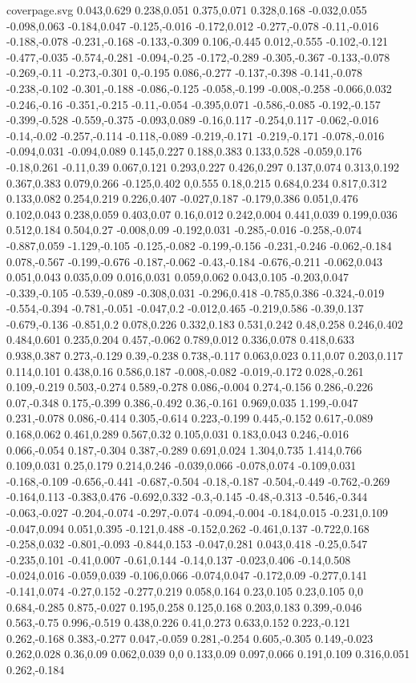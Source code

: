 \begin{filecontents}[noheader]{coverpage.svg}
0.043,0.629 0.238,0.051 0.375,0.071 0.328,0.168 -0.032,0.055 -0.098,0.063 -0.184,0.047 -0.125,-0.016 -0.172,0.012 -0.277,-0.078 -0.11,-0.016 -0.188,-0.078 -0.231,-0.168 -0.133,-0.309 0.106,-0.445 0.012,-0.555 -0.102,-0.121 -0.477,-0.035 -0.574,-0.281 -0.094,-0.25 -0.172,-0.289 -0.305,-0.367 -0.133,-0.078 -0.269,-0.11 -0.273,-0.301 0,-0.195 0.086,-0.277 -0.137,-0.398 -0.141,-0.078 -0.238,-0.102 -0.301,-0.188 -0.086,-0.125 -0.058,-0.199 -0.008,-0.258 -0.066,0.032 -0.246,-0.16 -0.351,-0.215 -0.11,-0.054 -0.395,0.071 -0.586,-0.085 -0.192,-0.157 -0.399,-0.528 -0.559,-0.375 -0.093,0.089 -0.16,0.117 -0.254,0.117 -0.062,-0.016 -0.14,-0.02 -0.257,-0.114 -0.118,-0.089 -0.219,-0.171 -0.219,-0.171 -0.078,-0.016 -0.094,0.031 -0.094,0.089 0.145,0.227 0.188,0.383 0.133,0.528 -0.059,0.176 -0.18,0.261 -0.11,0.39 0.067,0.121 0.293,0.227 0.426,0.297 0.137,0.074 0.313,0.192 0.367,0.383 0.079,0.266 -0.125,0.402 0,0.555 0.18,0.215 0.684,0.234 0.817,0.312 0.133,0.082 0.254,0.219 0.226,0.407 -0.027,0.187 -0.179,0.386 0.051,0.476 0.102,0.043 0.238,0.059 0.403,0.07 0.16,0.012 0.242,0.004 0.441,0.039 0.199,0.036 0.512,0.184 0.504,0.27 -0.008,0.09 -0.192,0.031 -0.285,-0.016 -0.258,-0.074 -0.887,0.059 -1.129,-0.105 -0.125,-0.082 -0.199,-0.156 -0.231,-0.246 -0.062,-0.184 0.078,-0.567 -0.199,-0.676 -0.187,-0.062 -0.43,-0.184 -0.676,-0.211 -0.062,0.043 0.051,0.043 0.035,0.09 0.016,0.031 0.059,0.062 0.043,0.105 -0.203,0.047 -0.339,-0.105 -0.539,-0.089 -0.308,0.031 -0.296,0.418 -0.785,0.386 -0.324,-0.019 -0.554,-0.394 -0.781,-0.051 -0.047,0.2 -0.012,0.465 -0.219,0.586 -0.39,0.137 -0.679,-0.136 -0.851,0.2 0.078,0.226 0.332,0.183 0.531,0.242 0.48,0.258 0.246,0.402 0.484,0.601 0.235,0.204 0.457,-0.062 0.789,0.012 0.336,0.078 0.418,0.633 0.938,0.387 0.273,-0.129 0.39,-0.238 0.738,-0.117 0.063,0.023 0.11,0.07 0.203,0.117 0.114,0.101 0.438,0.16 0.586,0.187 -0.008,-0.082 -0.019,-0.172 0.028,-0.261 0.109,-0.219 0.503,-0.274 0.589,-0.278 0.086,-0.004 0.274,-0.156 0.286,-0.226 0.07,-0.348 0.175,-0.399 0.386,-0.492 0.36,-0.161 0.969,0.035 1.199,-0.047 0.231,-0.078 0.086,-0.414 0.305,-0.614 0.223,-0.199 0.445,-0.152 0.617,-0.089 0.168,0.062 0.461,0.289 0.567,0.32 0.105,0.031 0.183,0.043 0.246,-0.016 0.066,-0.054 0.187,-0.304 0.387,-0.289 0.691,0.024 1.304,0.735 1.414,0.766 0.109,0.031 0.25,0.179 0.214,0.246 -0.039,0.066 -0.078,0.074 -0.109,0.031 -0.168,-0.109 -0.656,-0.441 -0.687,-0.504 -0.18,-0.187 -0.504,-0.449 -0.762,-0.269 -0.164,0.113 -0.383,0.476 -0.692,0.332 -0.3,-0.145 -0.48,-0.313 -0.546,-0.344 -0.063,-0.027 -0.204,-0.074 -0.297,-0.074 -0.094,-0.004 -0.184,0.015 -0.231,0.109 -0.047,0.094 0.051,0.395 -0.121,0.488 -0.152,0.262 -0.461,0.137 -0.722,0.168 -0.258,0.032 -0.801,-0.093 -0.844,0.153 -0.047,0.281 0.043,0.418 -0.25,0.547 -0.235,0.101 -0.41,0.007 -0.61,0.144 -0.14,0.137 -0.023,0.406 -0.14,0.508 -0.024,0.016 -0.059,0.039 -0.106,0.066 -0.074,0.047 -0.172,0.09 -0.277,0.141 -0.141,0.074 -0.27,0.152 -0.277,0.219 0.058,0.164 0.23,0.105 0.23,0.105 0,0 0.684,-0.285 0.875,-0.027 0.195,0.258 0.125,0.168 0.203,0.183 0.399,-0.046 0.563,-0.75 0.996,-0.519 0.438,0.226 0.41,0.273 0.633,0.152 0.223,-0.121 0.262,-0.168 0.383,-0.277 0.047,-0.059 0.281,-0.254 0.605,-0.305 0.149,-0.023 0.262,0.028 0.36,0.09 0.062,0.039 0,0 0.133,0.09 0.097,0.066 0.191,0.109 0.316,0.051 0.262,-0.184 
\end{filecontents}

